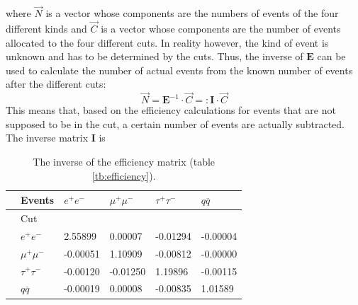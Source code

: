 where $\vec{N}$ is a vector whose components are the numbers of events of the four different kinds and $\vec{C}$ is a vector whose components are the number of events allocated to the four different cuts. 
In reality however, the kind of event is unknown and has to be determined by the cuts. Thus, the inverse of $\boldsymbol{E}$ can be used to calculate the number of actual events from the known number of events after the different cuts:
\begin{equation}
\vec{N}=\boldsymbol{E}^{-1}\cdot\vec{C}=:\boldsymbol{I}\cdot\vec{C}
\label{eq:numberevents}
\end{equation}
This means that, based on the efficiency calculations for events that are not supposed to be in the cut, a certain number of events are actually subtracted.
The inverse matrix $\boldsymbol{I}$ is
\begin{table}[H]\centering
	\begin{tabular}{@{}llllll@{}}
		\toprule
		&Events &$e^+e^-$&$\mu^+\mu^-$&$\tau^+\tau^-$&$q\overline{q}$\\
		\midrule
		&Cut&&&&\\
		&$e^+e^-$&2.55899&0.00007&-0.01294&-0.00004\\
		&$\mu^+\mu^-$&-0.00051&1.10909&-0.00812&-0.00000\\
		&$\tau^+\tau^-$&-0.00120&-0.01250&1.19896&-0.00115\\
		&$q\overline{q}$&-0.00019&0.00008&-0.00835&1.01589\\
		\bottomrule
	\end{tabular}
	\caption[Inverse efficiency matrix]{The inverse of the efficiency matrix (table \ref{tb:efficiency}).}
	\label{tb:invefficiency}
\end{table}

